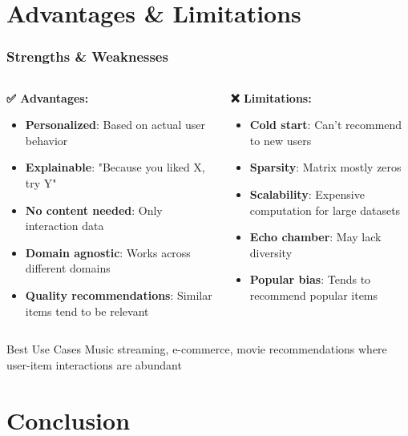 \documentclass[11pt]{beamer}
\begin{document}
\section{Advantages \& Limitations}

\begin{frame}
\frametitle{Strengths \& Weaknesses}
\begin{columns}
\begin{column}{0.5\textwidth}
\textbf{✅ Advantages:}
\begin{itemize}
\item \textbf{Personalized}: Based on actual user behavior
\item \textbf{Explainable}: "Because you liked X, try Y"
\item \textbf{No content needed}: Only interaction data
\item \textbf{Domain agnostic}: Works across different domains
\item \textbf{Quality recommendations}: Similar items tend to be relevant
\end{itemize}
\end{column}
\begin{column}{0.5\textwidth}
\textbf{❌ Limitations:}
\begin{itemize}
\item \textbf{Cold start}: Can't recommend to new users
\item \textbf{Sparsity}: Matrix mostly zeros
\item \textbf{Scalability}: Expensive computation for large datasets
\item \textbf{Echo chamber}: May lack diversity
\item \textbf{Popular bias}: Tends to recommend popular items
\end{itemize}
\end{column}
\end{columns}

\begin{block}{Best Use Cases}
Music streaming, e-commerce, movie recommendations where user-item interactions are abundant
\end{block}
\end{frame}

\section{Conclusion}
\end{document}
